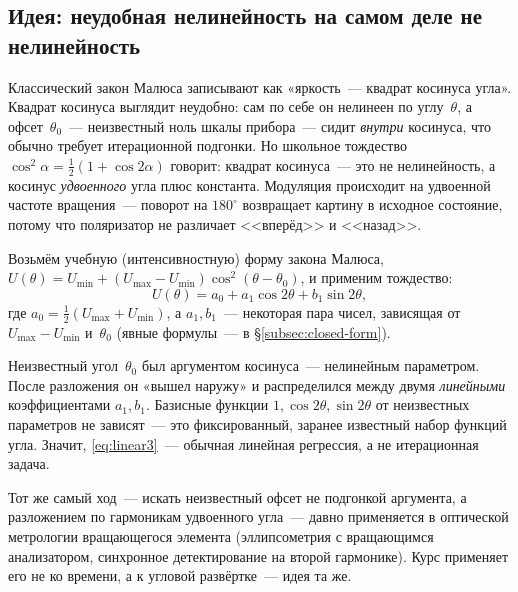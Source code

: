 \subsection{Идея: неудобная нелинейность на самом деле не нелинейность}
\label{subsec:idea}

\begin{intuition}
Классический закон Малюса записывают как «яркость~--- квадрат косинуса угла». Квадрат косинуса
выглядит неудобно: сам по себе он нелинеен по углу~$\theta$, а офсет~$\theta_0$~--- неизвестный
ноль шкалы прибора~--- сидит \emph{внутри} косинуса, что обычно требует итерационной подгонки.
Но школьное тождество $\cos^2\alpha=\tfrac12(1+\cos2\alpha)$ говорит: квадрат косинуса~--- это не
нелинейность, а косинус \emph{удвоенного} угла плюс константа. Модуляция происходит на удвоенной
частоте вращения~--- поворот на $180^\circ$ возвращает картину в исходное состояние, потому что
поляризатор не различает <<вперёд>> и <<назад>>.
\end{intuition}

Возьмём учебную (интенсивностную) форму закона Малюса, $U(\theta)=U_{\min}+(U_{\max}-U_{\min})
\cos^2(\theta-\theta_0)$, и применим тождество:
\begin{equation}
  U(\theta)=a_0+a_1\cos2\theta+b_1\sin2\theta,
  \label{eq:linear3}
\end{equation}
где $a_0=\tfrac12(U_{\max}+U_{\min})$, а $a_1,b_1$~--- некоторая пара чисел, зависящая от
$U_{\max}-U_{\min}$ и~$\theta_0$ (явные формулы~--- в §\ref{subsec:closed-form}).

\begin{strict}
Неизвестный угол~$\theta_0$ был аргументом косинуса~--- нелинейным параметром. После разложения он
«вышел наружу» и распределился между двумя \emph{линейными} коэффициентами $a_1,b_1$. Базисные
функции $1,\cos2\theta,\sin2\theta$ от неизвестных параметров не зависят~--- это фиксированный,
заранее известный набор функций угла. Значит, \eqref{eq:linear3}~--- обычная линейная регрессия, а
не итерационная задача.
\end{strict}

\begin{intuition}
Тот же самый ход~--- искать неизвестный офсет не подгонкой аргумента, а разложением по гармоникам
удвоенного угла~--- давно применяется в оптической метрологии вращающегося элемента (эллипсометрия
с вращающимся анализатором, синхронное детектирование на второй гармонике). Курс применяет его не
ко времени, а к угловой развёртке~--- идея та же.
\end{intuition}

